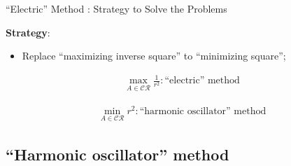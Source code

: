 \documentclass[aspectratio=169, bigfiles]{beamer}
\newcommand{\CR}{\mathcal{CR}}
\begin{document}
\begin{frame}{``Electric'' Method : Strategy to Solve the Problems}
    \begin{tcolorbox}[colframe=yellow,
colback=yellow!10!white,
colbacktitle=yellow!40!white,
coltitle=black, fonttitle=\bfseries]
\textbf{Strategy}: 
    \begin{itemize}
        \item
        Replace ``maximizing inverse square'' to ``minimizing square'';
    \end{itemize}
    \begin{align*}
        \max_{A\in\CR} \frac{1}{r^{2}} : \text{``electric'' method}
    \end{align*}
    \begin{center}
    \end{center}
    \begin{align*}
        \min_{A\in\CR} r^{2} : \text{``harmonic oscillator'' method}
    \end{align*}
\end{tcolorbox}
\end{frame}



\subsection{``Harmonic oscillator'' method}
\end{document}
